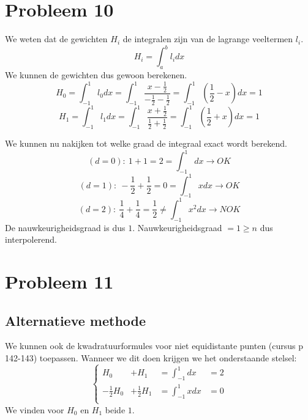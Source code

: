 \documentclass[12pt,a4paper]{article}
\begin{document}
\section{Probleem 10}
We weten dat de gewichten $H_i$ de integralen zijn van de lagrange veeltermen $l_i$.
\[
H_i = \int_{a}^{b}l_idx
\]
We kunnen de gewichten dus gewoon berekenen.
\[
H_0 = \int_{-1}^{1}l_{0}dx = \int_{-1}^{1}\frac{x - \frac{1}{2}}{-\frac{1}{2}-\frac{1}{2}} = \int_{-1}^{1}\left(\frac{1}{2}-x\right)dx = 1
\]
\[
H_1 = \int_{-1}^{1}l_{1}dx = \int_{-1}^{1}\frac{x + \frac{1}{2}}{\frac{1}{2}+\frac{1}{2}} = \int_{-1}^{1}\left(\frac{1}{2}+x\right)dx = 1
\]

We kunnen nu nakijken tot welke graad de integraal exact wordt berekend.
\[
(d=0):\ 1+1=2=\int_{-1}^{1}dx \rightarrow OK
\]
\[
(d=1):\ -\frac{1}{2}+\frac{1}{2}=0=\int_{-1}^{1}xdx \rightarrow OK
\]
\[
(d=2):\ \frac{1}{4}+\frac{1}{4}=\frac{1}{2}\neq\int_{-1}^{1}x^2dx \rightarrow NOK
\]
De nauwkeurigheidsgraad is dus $1$.
Nauwkeurigheidsgraad $ = 1 \ge n$ dus interpolerend.

\section{Probleem 11}

\subsection*{Alternatieve methode}
We kunnen ook de kwadratuurformules voor niet equidistante punten (cursus p 142-143) toepassen. Wanneer we dit doen krijgen we het onderstaande stelsel:
\[
\left\{
\begin{array}{cccc}
H_0 &+ H_1 &= \int_{-1}^{1}dx &= 2\\
-\frac{1}{2}H_0 &+ \frac{1}{2}H_1 &= \int_{-1}^{1}xdx &= 0\\
\end{array}
\right.
\]
We vinden voor $H_0$ en $H_1$ beide $1$.
\end{document}
